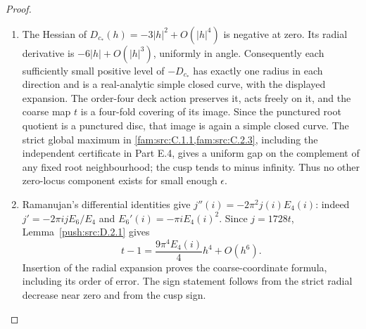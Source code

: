 \begin{proof}
\begin{enumerate}[label=\arabic*.,leftmargin=*]
\item The Hessian of \(D_{c_*}(h)=-3|h|^2+O(|h|^4)\) is negative
at zero. Its radial derivative is \(-6|h|+O(|h|^3)\), uniformly
in angle. Consequently each sufficiently small positive level of
\(-D_{c_*}\) has exactly one radius in each direction and is a
real-analytic simple closed curve, with the displayed expansion.
The order-four deck action preserves it, acts freely on it, and the
coarse map \(t\) is a four-fold covering of its image. Since the
punctured root quotient is a punctured disc, that image is again a
simple closed curve. The strict global maximum in \cref{fam:src:C.1.1,fam:src:C.2.3}, including the
independent certificate in Part E.4, gives a uniform gap on the
complement of any fixed root neighbourhood; the cusp tends to minus
infinity. Thus no other zero-locus component exists for small enough
\(\epsilon\).

\item Ramanujan's differential identities give
\(j''(i)=-2\pi^2j(i)E_4(i)\): indeed
\(j'=-2\pi i jE_6/E_4\) and
\(E_6'(i)=-\pi iE_4(i)^2\). Since \(j=1728t\), Lemma~\ref{push:src:D.2.1} gives
\[
 t-1=\frac{9\pi^4E_4(i)}4h^4+O(h^6).
\]
Insertion of the radial expansion proves the coarse-coordinate
formula, including its order of error. The sign statement follows
from the strict radial decrease near zero and from the cusp sign.
\end{enumerate}
\end{proof}

